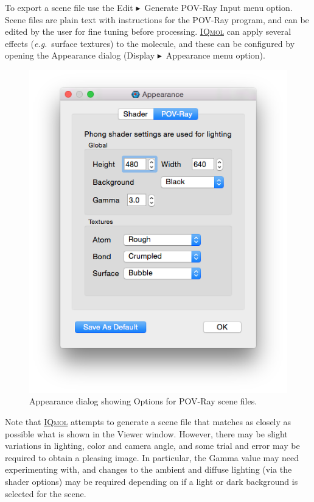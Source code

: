 \documentclass[a4paper,12pt]{article}
\newcommand{\iqmol}{\href{http://iqmol.org}{{\scshape IQmol}}}
\newcommand{\bt}{\ensuremath{\blacktriangleright}}
\newcommand{\eg}{\emph{e.g.}}
\begin{document}
To export a scene file use the Edit \bt\ Generate POV-Ray Input menu option.
Scene files are plain text with instructions for the POV-Ray program, and can
be edited by the user for fine tuning before processing.  \iqmol{} can apply
several effects (\eg\ surface textures) to the molecule, and these can be
configured by opening the Appearance dialog (Display \bt\ Appearance menu
option).

\begin{figure}[h]
\begin{center}
\includegraphics[scale=0.20]{figures/POVRayDialog.png}
\caption{Appearance dialog showing Options for POV-Ray scene files.}
\end{center}
\end{figure}

Note that \iqmol{} attempts to generate a scene file that matches as closely as
possible what is shown in the Viewer window.  However, there may be slight
variations in lighting, color and camera angle, and some trial and error may be
required to obtain a pleasing image.  In particular, the Gamma value may need
experimenting with, and changes to the ambient and diffuse lighting (via the
shader options) may be required depending on if a light or dark background is
selected for the scene.
\end{document}
